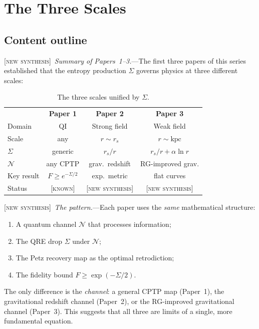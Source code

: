 \documentclass[prl,twocolumn,superscriptaddress,longbibliography,floatfix]{revtex4-2}
\newcommand{\chan}{\mathcal{N}}
\newcommand{\known}{\textsc{[known]}}
\newcommand{\newsyn}{\textsc{[new synthesis]}}
\begin{document}
\section{The Three Scales}
\label{sec:three_scales}

\subsection*{Content outline}

\newsyn\ \emph{Summary of Papers~1--3.}---The first three papers
of this series established that the entropy production
$\Sigma$ governs physics at three different scales:

\begin{table}[htbp]
\caption{\label{tab:three_scales}The three scales unified by
$\Sigma$.}
\begin{ruledtabular}
\begin{tabular}{lccc}
& \textbf{Paper 1} & \textbf{Paper 2} & \textbf{Paper 3} \\
\colrule
Domain & QI & Strong field & Weak field \\
Scale & any & $r \sim r_s$ & $r \sim \mathrm{kpc}$ \\
$\Sigma$ & generic & $r_s/r$ & $r_s/r + \alpha\ln r$ \\
$\chan$ & any CPTP & grav.\ redshift & RG-improved grav. \\
Key result & $F \geq e^{-\Sigma/2}$ & exp.\ metric & flat curves \\
Status & \known & \newsyn & \newsyn \\
\end{tabular}
\end{ruledtabular}
\end{table}

\newsyn\ \emph{The pattern.}---Each paper uses the \emph{same}
mathematical structure:
\begin{enumerate}
\item A quantum channel $\chan$ that processes information;
\item The QRE drop $\Sigma$ under $\chan$;
\item The Petz recovery map as the optimal retrodiction;
\item The fidelity bound $F \geq \exp(-\Sigma/2)$.
\end{enumerate}
The only difference is the \emph{channel}: a general CPTP map
(Paper~1), the gravitational redshift channel (Paper~2), or the
RG-improved gravitational channel (Paper~3). This suggests that
all three are limits of a single, more fundamental equation.
\end{document}
